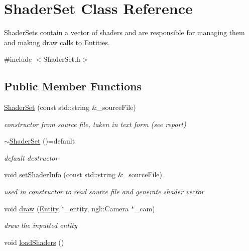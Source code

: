 \hypertarget{class_shader_set}{\section{Shader\-Set Class Reference}
\label{class_shader_set}
}


Shader\-Sets contain a vector of shaders and are responsible for managing them and making draw calls to Entities.  




{\ttfamily \#include $<$Shader\-Set.\-h$>$}

\subsection*{Public Member Functions}
\begin{DoxyCompactItemize}
\item 
\hyperlink{class_shader_set_a9bbabbd777c8ca13efb7d8b1d919fb11}{Shader\-Set} (const std\-::string \&\-\_\-source\-File)
\begin{DoxyCompactList}\small\item\em constructor from source file, taken in text form (see report) \end{DoxyCompactList}\item 
\hypertarget{class_shader_set_a026cd1988dbd45e6e7e061b2d92d8fbd}{\hyperlink{class_shader_set_a026cd1988dbd45e6e7e061b2d92d8fbd}{$\sim$\-Shader\-Set} ()=default}\label{class_shader_set_a026cd1988dbd45e6e7e061b2d92d8fbd}

\begin{DoxyCompactList}\small\item\em default destructor \end{DoxyCompactList}\item 
void \hyperlink{class_shader_set_aede001dacb08e161768755e9018d0d12}{set\-Shader\-Info} (const std\-::string \&\-\_\-source\-File)
\begin{DoxyCompactList}\small\item\em used in constructor to read source file and generate shader vector \end{DoxyCompactList}\item 
void \hyperlink{class_shader_set_adc30a6cd9c60ac29c6a103f60d9b4929}{draw} (\hyperlink{class_entity}{Entity} $\ast$\-\_\-entity, ngl\-::\-Camera $\ast$\-\_\-cam)
\begin{DoxyCompactList}\small\item\em draw the inputted entity \end{DoxyCompactList}\item 
\hypertarget{class_shader_set_a716a9bdfc98bd1c43f3c07bbf8b492b8}{void \hyperlink{class_shader_set_a716a9bdfc98bd1c43f3c07bbf8b492b8}{load\-Shaders} ()}\label{class_shader_set_a716a9bdfc98bd1c43f3c07bbf8b492b8}


\end{DoxyCompactItemize}
